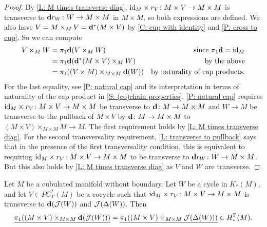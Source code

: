 \begin{proof}
	By \cref{L: M times transverse diag}, $\mathrm{id}_M \times r_V \colon M \times V \to M \times M$ is transverse to $\mathbf{d} r_W \colon W \to M \times M$ in $M \times M$, so both expressions are defined.
	We also have $V = M \times_M V = \mathbf{d}^*(M \times V)$ by \cref{C: cup with identity} and \cref{P: cross to cup}.
	So we can compute
	\begin{align*}
		V \times_M W& = \pi_1\mathbf{d} (V \times_M W)&\text{since $\pi_1\mathbf{d} = \mathrm{id}_M$}\\
		& = \pi_1\mathbf{d} (\mathbf{d}^*(M \times V) \times_M W)&\text{by the above}\\
		& = \pi_1((V \times M)\times_{M \times M}\mathbf{d}(W))&\text{by naturality of cap products.}
	\end{align*}
	For the last equality, see \cref{P: natural cap} and its interpretation in terms of naturality of the cap product in \cref{S: (co)chain properties}.
	\cref{P: natural cap} requires $\mathrm{id}_M \times r_V \colon M \times V \to M \times M$ be transverse to $\mathbf{d} \colon M \to M \times M$ and $W \to M$ be transverse to the pullback of $M \times V$ by $\mathbf{d} \colon M \to M \times M$ to
	$(M \times V)\times_{M \times M}M \to M$.
	The first requirement holds by \cref{L: M times transverse diag}.
	For the second transversality requirement, \cref{L: transverse to pullback} says that in the presence of the first transversality condition, this is equivalent to requiring $\mathrm{id}_M \times r_V \colon M \times V \to M \times M$ to be transverse to $\mathbf{d} r_W \colon W \to M \times M$.
	But this also holds by \cref{L: M times transverse diag} as $V$ and $W$ are transverse.
\end{proof}

\begin{lemma}\label{L: diagonal equivalence}
	Let $M$ be a cubulated manifold without boundary.
	Let $W$ be a cycle in $K_*(M)$, and let $V \in PC^*_\Gamma(M)$ be a cocycle such that $\mathrm{id}_M \times r_V \colon M \times V \to M \times M$ is transverse to $\mathbf{d}(\mathcal{J}(W))$ and $\mathcal{J}(\Delta(W))$.
	Then $$\underline{\pi_1((M \times V) \times_{M \times M}\mathbf{d}(\mathcal{J}(W)))} = \underline{\pi_1( (M \times V)\times_{M \times M}\mathcal{J}(\Delta(W)))} \in H_*^\Gamma(M).$$
\end{lemma}

